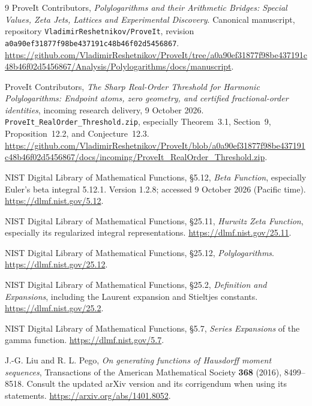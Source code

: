 \documentclass[11pt]{article}
\numberwithin{equation}{section}
\theoremstyle{definition}\newtheorem{definition}[theorem]{Definition}
\theoremstyle{remark}\newtheorem{remark}[theorem]{Remark}
\newcommand{\basecommit}{\nolinkurl{a0a90ef31877f98be437191c48b46f02d5456867}}
\begin{document}
\begin{thebibliography}{9}
ProveIt Contributors, \emph{Polylogarithms and their Arithmetic Bridges:
Special Values, Zeta Jets, Lattices and Experimental Discovery}.
Canonical manuscript, repository \texttt{VladimirReshetnikov/ProveIt},
revision \basecommit.
\url{https://github.com/VladimirReshetnikov/ProveIt/tree/a0a90ef31877f98be437191c48b46f02d5456867/Analysis/Polylogarithms/docs/manuscript}.

ProveIt Contributors, \emph{The Sharp Real-Order Threshold for Harmonic
Polylogarithms: Endpoint atoms, zero geometry, and certified fractional-order
identities}, incoming research delivery, 9 October 2026.
\texttt{ProveIt\_RealOrder\_Threshold.zip}, especially Theorem~3.1,
Section~9, Proposition~12.2, and Conjecture~12.3.
\url{https://github.com/VladimirReshetnikov/ProveIt/blob/a0a90ef31877f98be437191c48b46f02d5456867/docs/incoming/ProveIt_RealOrder_Threshold.zip}.

NIST Digital Library of Mathematical Functions, \S5.12,
\emph{Beta Function}, especially Euler's beta integral 5.12.1.
Version 1.2.8; accessed 9 October 2026 (Pacific time).
\url{https://dlmf.nist.gov/5.12}.

NIST Digital Library of Mathematical Functions, \S25.11,
\emph{Hurwitz Zeta Function}, especially its regularized integral
representations. \url{https://dlmf.nist.gov/25.11}.

NIST Digital Library of Mathematical Functions, \S25.12,
\emph{Polylogarithms}. \url{https://dlmf.nist.gov/25.12}.

NIST Digital Library of Mathematical Functions, \S25.2,
\emph{Definition and Expansions}, including the Laurent expansion and
Stieltjes constants. \url{https://dlmf.nist.gov/25.2}.

NIST Digital Library of Mathematical Functions, \S5.7,
\emph{Series Expansions} of the gamma function.
\url{https://dlmf.nist.gov/5.7}.

J.-G. Liu and R. L. Pego, \emph{On generating functions of Hausdorff
moment sequences}, Transactions of the American Mathematical Society
\textbf{368} (2016), 8499--8518. Consult the updated arXiv version and
its corrigendum when using its statements.
\url{https://arxiv.org/abs/1401.8052}.
\end{thebibliography}
\end{document}
